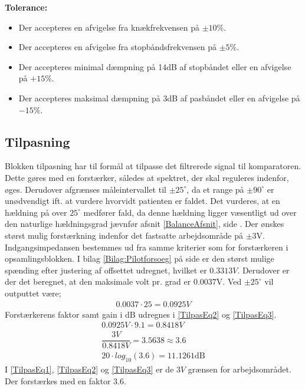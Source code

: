 \textbf{Tolerance:}
\begin{itemize}
	\item Der accepteres en afvigelse fra knækfrekvensen på $\pm10\%$.
	\item Der accepteres en afvigelse fra stopbåndsfrekvensen på $\pm5\%$.
	\item Der accepteres minimal dæmpning på 14dB af stopbåndet eller en afvigelse på $+15\%$.
	\item Der accepteres maksimal dæmpning på 3dB af pasbåndet eller en afvigelse på $-15\%$.
\end{itemize}
\subsection{Tilpasning}\label{Tilpasningsblok}
Blokken tilpasning har til formål at tilpasse det filtrerede signal til komparatoren. Dette gøres med en forstærker, således at spektret, der skal reguleres indenfor, øges. Derudover afgrænses måleintervallet til $\pm25^{\circ}$, da et range på $\pm90^{\circ}$ er unødvendigt ift. at vurdere hvorvidt patienten er faldet. Det vurderes, at en hældning på over $25^{\circ}$ medfører fald, da denne hældning ligger væsentligt ud over den naturlige hældningsgrad jævnfør afsnit \ref{BalanceAfsnit}, side \pageref{BalanceAfsnit}. Der ønskes størst mulig forstærkning indenfor det fastsatte arbejdsområde på $\pm3$V. Indgangsimpedansen bestemmes ud fra samme kriterier som for forstærkeren i opsamlingsblokken. I bilag \ref{Bilag:Pilotforsoeg} på side \pageref{Bilag:Pilotforsoeg} er den størst mulige spænding efter justering af offsettet udregnet, hvilket er $0.3313V$. Derudover er der det beregnet, at den maksimale volt pr. grad er $0.0037$V. Ved $\pm25^{\circ}$ vil outputtet være;
\begin{align}
\label{Udreg3} 0.0037 \cdot 25 = 0.0925V
\end{align}
Forstærkerens faktor samt gain i dB udregnes i \eqref{TilpasEq2} og \eqref{TilpasEq3}.
\begin{align}
\label{TilpasEq1} 0.0925V \cdot 9.1 = 0.8418V \\
\label{TilpasEq2} \dfrac{3V}{0.8418V} = 3.5638 \approx 3.6 \\
\label{TilpasEq3} 20 \cdot log_{10} (3.6) = 11.1261\text{dB}
\end{align} 
I \eqref{TilpasEq1}, \eqref{TilpasEq2} og \eqref{TilpasEq3} er de $3V$ grænsen for arbejdsområdet. Der forstærkes med en faktor $3.6$. \\


